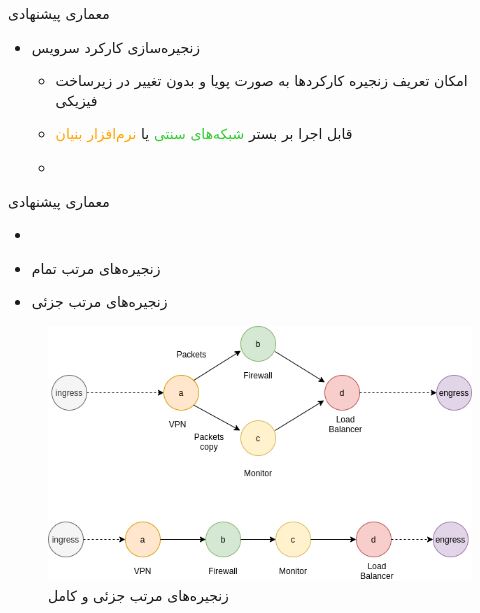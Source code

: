 \documentclass[dvipsnames]{beamer}
\makeatletter
\newcommand{\RTList}{\raggedleft\rightskip\@totalleftmargin}
\makeatother
\begin{document}
\begin{persian}
	\begin{frame}{معماری پیشنهادی}
		\begin{itemize}\RTList{}
			\justifying
			\item زنجیره‌سازی کارکرد سرویس
						\begin{itemize}\RTList{}
							\item امکان تعریف زنجیره کارکردها به صورت پویا و بدون تغییر در زیرساخت فیزیکی
							\item قابل اجرا بر بستر \textcolor{LimeGreen}{شبکه‌های سنتی} یا \textcolor{Orange}{نرم‌افزار بنیان}
							\item {}
						\end{itemize}
		\end{itemize}
	\end{frame}

	\begin{frame}{معماری پیشنهادی}
		\begin{itemize}\RTList{}
			\justifying
			\item \cite{Yang2021}
			\item زنجیره‌های مرتب تمام
			\item زنجیره‌های مرتب جزئی
		\end{itemize}
		\begin{center}\begin{figure}
				\includegraphics[scale=0.3]{images/partially-totally-sfc.png}
				\caption{زنجیره‌های مرتب جزئی و کامل}
			\end{figure}\end{center}
	\end{frame}


\end{persian}
\end{document}

